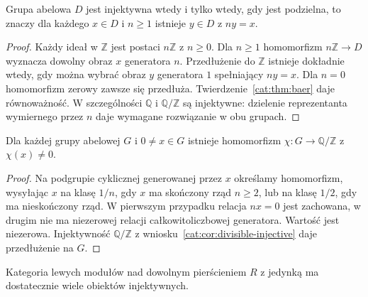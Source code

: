 \begin{wniosek}\label{cat:cor:divisible-injective}
Grupa abelowa $D$ jest injektywna wtedy i tylko wtedy, gdy jest podzielna, to znaczy dla każdego $x\in D$ i $n\ge1$ istnieje $y\in D$ z $ny=x$.
\end{wniosek}
\begin{proof}
Każdy ideał w $\mathbb Z$ jest postaci $n\mathbb Z$ z $n\ge0$. Dla $n\ge1$ homomorfizm $n\mathbb Z\to D$ wyznacza dowolny obraz $x$ generatora $n$. Przedłużenie do $\mathbb Z$ istnieje dokładnie wtedy, gdy można wybrać obraz $y$ generatora $1$ spełniający $ny=x$. Dla $n=0$ homomorfizm zerowy zawsze się przedłuża. Twierdzenie~\ref{cat:thm:baer} daje równoważność. W szczególności $\mathbb Q$ i $\mathbb Q/\mathbb Z$ są injektywne: dzielenie reprezentanta wymiernego przez $n$ daje wymagane rozwiązanie w obu grupach.
\end{proof}
\begin{lemat}\label{cat:lem:injective-cogenerator}
Dla każdej grupy abelowej $G$ i $0\ne x\in G$ istnieje homomorfizm $\chi:G\to\mathbb Q/\mathbb Z$ z $\chi(x)\ne0$.
\end{lemat}
\begin{proof}
Na podgrupie cyklicznej generowanej przez $x$ określamy homomorfizm, wysyłając $x$ na klasę $1/n$, gdy $x$ ma skończony rząd $n\ge2$, lub na klasę $1/2$, gdy ma nieskończony rząd. W pierwszym przypadku relacja $nx=0$ jest zachowana, w drugim nie ma niezerowej relacji całkowitoliczbowej generatora. Wartość jest niezerowa. Injektywność $\mathbb Q/\mathbb Z$ z wniosku~\ref{cat:cor:divisible-injective} daje przedłużenie na $G$.
\end{proof}
\begin{twierdzenie}\label{cat:thm:enough-injectives-mod}
Kategoria lewych modułów nad dowolnym pierścieniem $R$ z jedynką ma dostatecznie wiele obiektów injektywnych.
\end{twierdzenie}
